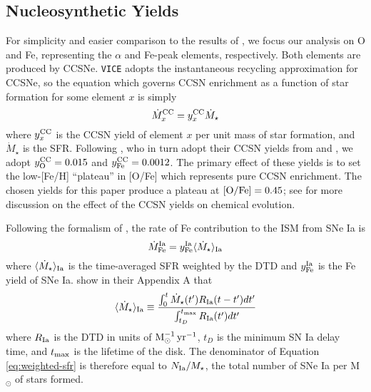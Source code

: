 \documentclass[twocolumn,twocolappendix,linenumbers]{aastex631}
\newcommand{\vice}{{\tt VICE}\xspace}
\begin{document}
\subsection{Nucleosynthetic Yields}
\label{sec:yields}

For simplicity and easier comparison to the results of , we focus our analysis on O and Fe, representing the $\alpha$ and Fe-peak elements, respectively. Both elements are produced by CCSNe. \vice adopts the instantaneous recycling approximation for CCSNe, so the equation which governs CCSN enrichment as a function of star formation for some element $x$ is simply
\begin{equation}
    \dot M_x^{\rm CC} = y_x^{\rm CC} \dot M_\star
    \label{eq:ccsn-enrichment}
\end{equation}
where $y_x^{\rm CC}$ is the CCSN yield of element $x$ per unit mass of star formation, and $\dot M_\star$ is the SFR. Following , who in turn adopt their CCSN yields from \citet{ChieffiLimongi2004-CCSNYields} and \citet{LimongiChieffi2006-CCSNYields}, we adopt $y_{\rm O}^{\rm CC}=0.015$ and $y_{\rm Fe}^{\rm CC}=0.0012$. The primary effect of these yields is to set the low-[Fe/H] ``plateau'' in [O/Fe] which represents pure CCSN enrichment. The chosen yields for this paper produce a plateau at ${\rm [O/Fe]}=0.45$; see \citet{Weinberg2023-CCSNYield} for more discussion on the effect of the CCSN yields on chemical evolution.

Following the formalism of \citet{Weinberg2017-ChemicalEquilibrium}, the rate of Fe contribution to the ISM from SNe Ia is 
\begin{equation}
    \dot M_{\rm Fe}^{\rm Ia} = y_{\rm Fe}^{\rm Ia} \langle \dot M_\star\rangle_{\rm Ia} \\
\end{equation}
where $\langle \dot M_\star\rangle_{\rm Ia}$ is the time-averaged SFR weighted by the DTD and $y_{\rm Fe}^{\rm Ia}$ is the Fe yield of SNe Ia. \citet{Weinberg2017-ChemicalEquilibrium} show in their Appendix A that
\begin{equation}
    \langle \dot M_\star\rangle_{\rm Ia} \equiv \frac{\int_0^t \dot M_\star(t')R_{\rm Ia}(t-t')dt'}{\int_{t_D}^{t_{\rm max}} R_{\rm Ia}(t')dt'}
    \label{eq:weighted-sfr}
\end{equation}
where $R_{\rm Ia}$ is the DTD in units of ${\rm M}_\odot^{-1}\,{\rm yr}^{-1}$, $t_D$ is the minimum SN Ia delay time, and $t_{\rm max}$ is the lifetime of the disk. The denominator of Equation \ref{eq:weighted-sfr} is therefore equal to $N_{\rm Ia}/M_\star$, the total number of SNe Ia per M$_{\odot}$ of stars formed.
\end{document}
